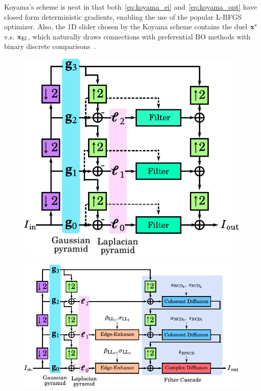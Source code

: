 Koyama's scheme is neat in that both~\cref{eq:koyama_ei} and~\cref{eq:koyama_opt} have closed form deterministic gradients, enabling the use of the popular L-BFGS~\cite{liu_limited_1989} optimizer.
Also, the 1D slider chosen by the Koyama scheme contains the duel \(\mathbf{x}^*\) v.s. \(\mathbf{x}_{\mathrm{EI}}\), which naturally draws connections with preferential BO methods with binary discrete comparisons~\cite{NIPS2007_b6a1085a}.


\begin{figure}
  \hspace{-0.3in}
  \centering
  \begin{minipage}[c]{0.43\textwidth}
    \centering
    \includegraphics[scale=0.6]{figures/conventional_laplacian_pyramid.pdf}
    \label{fig:lpnd}
  \end{minipage}
  \begin{minipage}[c]{0.53\textwidth}
    \centering
    \includegraphics[scale=0.6]{figures/multiscale_filter.pdf}

\end{minipage}
\end{figure}
